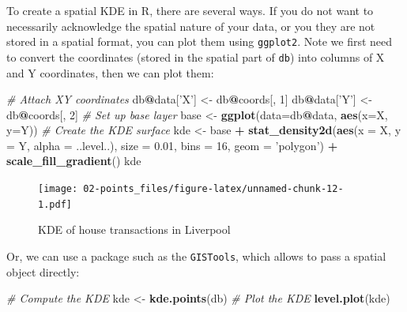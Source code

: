 \documentclass[]{book}
\newenvironment{Shaded}{\begin{snugshade}}{\end{snugshade}}
\newcommand{\CommentTok}[1]{\textcolor[rgb]{0.56,0.35,0.01}{\textit{#1}}}
\newcommand{\DataTypeTok}[1]{\textcolor[rgb]{0.13,0.29,0.53}{#1}}
\newcommand{\DecValTok}[1]{\textcolor[rgb]{0.00,0.00,0.81}{#1}}
\newcommand{\FloatTok}[1]{\textcolor[rgb]{0.00,0.00,0.81}{#1}}
\newcommand{\KeywordTok}[1]{\textcolor[rgb]{0.13,0.29,0.53}{\textbf{#1}}}
\newcommand{\NormalTok}[1]{#1}
\newcommand{\OperatorTok}[1]{\textcolor[rgb]{0.81,0.36,0.00}{\textbf{#1}}}
\newcommand{\StringTok}[1]{\textcolor[rgb]{0.31,0.60,0.02}{#1}}
\begin{document}
To create a spatial KDE in R, there are several ways. If you do not want to necessarily acknowledge the spatial nature of your data, or you they are not stored in a spatial format, you can plot them using \texttt{ggplot2}. Note we first need to convert the coordinates (stored in the spatial part of \texttt{db}) into columns of X and Y coordinates, then we can plot them:

\begin{Shaded}
\begin{Highlighting}[]
\CommentTok{# Attach XY coordinates}
\NormalTok{db}\OperatorTok{@}\NormalTok{data[}\StringTok{'X'}\NormalTok{] <-}\StringTok{ }\NormalTok{db}\OperatorTok{@}\NormalTok{coords[, }\DecValTok{1}\NormalTok{]}
\NormalTok{db}\OperatorTok{@}\NormalTok{data[}\StringTok{'Y'}\NormalTok{] <-}\StringTok{ }\NormalTok{db}\OperatorTok{@}\NormalTok{coords[, }\DecValTok{2}\NormalTok{]}
\CommentTok{# Set up base layer}
\NormalTok{base <-}\StringTok{ }\KeywordTok{ggplot}\NormalTok{(}\DataTypeTok{data=}\NormalTok{db}\OperatorTok{@}\NormalTok{data, }\KeywordTok{aes}\NormalTok{(}\DataTypeTok{x=}\NormalTok{X, }\DataTypeTok{y=}\NormalTok{Y))}
\CommentTok{# Create the KDE surface}
\NormalTok{kde <-}\StringTok{ }\NormalTok{base }\OperatorTok{+}\StringTok{ }\KeywordTok{stat_density2d}\NormalTok{(}\KeywordTok{aes}\NormalTok{(}\DataTypeTok{x =}\NormalTok{ X, }\DataTypeTok{y =}\NormalTok{ Y, }\DataTypeTok{alpha =}\NormalTok{ ..level..), }
               \DataTypeTok{size =} \FloatTok{0.01}\NormalTok{, }\DataTypeTok{bins =} \DecValTok{16}\NormalTok{, }\DataTypeTok{geom =} \StringTok{'polygon'}\NormalTok{) }\OperatorTok{+}
\StringTok{            }\KeywordTok{scale_fill_gradient}\NormalTok{()}
\NormalTok{kde}
\end{Highlighting}
\end{Shaded}

\begin{figure}
\centering
\texttt{[image: 02-points\_files/figure-latex/unnamed-chunk-12-1.pdf]}
\caption{\label{fig:unnamed-chunk-12}KDE of house transactions in Liverpool}
\end{figure}

Or, we can use a package such as the \texttt{GISTools}, which allows to pass a spatial object directly:

\begin{Shaded}
\begin{Highlighting}[]
\CommentTok{# Compute the KDE}
\NormalTok{kde <-}\StringTok{ }\KeywordTok{kde.points}\NormalTok{(db)}
\CommentTok{# Plot the KDE}
\KeywordTok{level.plot}\NormalTok{(kde)}
\end{Highlighting}
\end{Shaded}
\end{document}
